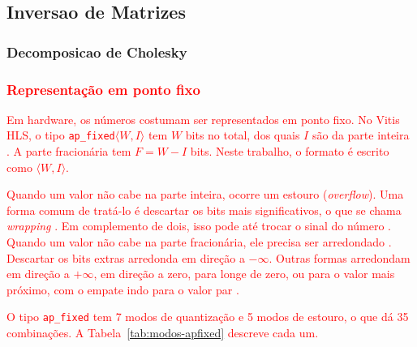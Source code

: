 \subsection{Inversao de Matrizes}\label{subsec:inversao}

\subsubsection{Decomposicao de Cholesky}


\subsubsection{\textcolor{red}{Representação em ponto fixo}}\label{subsubsec:ponto-fixo}
\textcolor{red}{Em hardware, os números costumam ser representados em ponto fixo. No Vitis HLS, o tipo \texttt{ap\_fixed}$\langle W, I\rangle$ tem $W$ bits no total, dos quais $I$ são da parte inteira \cite[p.~73--74]{kastner-hls}. A parte fracionária tem $F = W - I$ bits. Neste trabalho, o formato é escrito como $\langle W, I\rangle$.}

\textcolor{red}{Quando um valor não cabe na parte inteira, ocorre um estouro (\textit{overflow}). Uma forma comum de tratá-lo é descartar os bits mais significativos, o que se chama \textit{wrapping} \cite[p.~70]{kastner-hls}. Em complemento de dois, isso pode até trocar o sinal do número \cite[p.~71]{kastner-hls}. Quando um valor não cabe na parte fracionária, ele precisa ser arredondado \cite[p.~71]{kastner-hls}. Descartar os bits extras arredonda em direção a $-\infty$. Outras formas arredondam em direção a $+\infty$, em direção a zero, para longe de zero, ou para o valor mais próximo, com o empate indo para o valor par \cite[p.~71]{kastner-hls}.}

\textcolor{red}{O tipo \texttt{ap\_fixed} tem 7 modos de quantização e 5 modos de estouro, o que dá 35 combinações. A Tabela~\ref{tab:modos-apfixed} descreve cada um.} %

